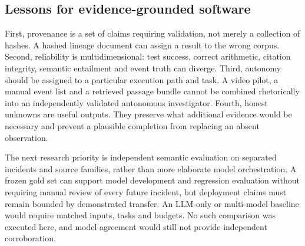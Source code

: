 \subsection{Lessons for evidence-grounded software}
First, provenance is a set of claims requiring validation, not merely a collection of hashes. A hashed lineage document can assign a result to the wrong corpus. Second, reliability is multidimensional: test success, correct arithmetic, citation integrity, semantic entailment and event truth can diverge. Third, autonomy should be assigned to a particular execution path and task. A video pilot, a manual event list and a retrieved passage bundle cannot be combined rhetorically into an independently validated autonomous investigator. Fourth, honest unknowns are useful outputs. They preserve what additional evidence would be necessary and prevent a plausible completion from replacing an absent observation.

The next research priority is independent semantic evaluation on separated incidents and source families, rather than more elaborate model orchestration. A frozen gold set can support model development and regression evaluation without requiring manual review of every future incident, but deployment claims must remain bounded by demonstrated transfer. An LLM-only or multi-model baseline would require matched inputs, tasks and budgets. No such comparison was executed here, and model agreement would still not provide independent corroboration.
